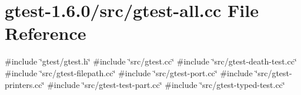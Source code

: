 \hypertarget{src_2gtest-all_8cc}{\section{gtest-\/1.6.0/src/gtest-\/all.cc \-File \-Reference}
\label{db/d32/src_2gtest-all_8cc}
}
{\ttfamily \#include \char`\"{}gtest/gtest.\-h\char`\"{}}\*
{\ttfamily \#include \char`\"{}src/gtest.\-cc\char`\"{}}\*
{\ttfamily \#include \char`\"{}src/gtest-\/death-\/test.\-cc\char`\"{}}\*
{\ttfamily \#include \char`\"{}src/gtest-\/filepath.\-cc\char`\"{}}\*
{\ttfamily \#include \char`\"{}src/gtest-\/port.\-cc\char`\"{}}\*
{\ttfamily \#include \char`\"{}src/gtest-\/printers.\-cc\char`\"{}}\*
{\ttfamily \#include \char`\"{}src/gtest-\/test-\/part.\-cc\char`\"{}}\*
{\ttfamily \#include \char`\"{}src/gtest-\/typed-\/test.\-cc\char`\"{}}\*
